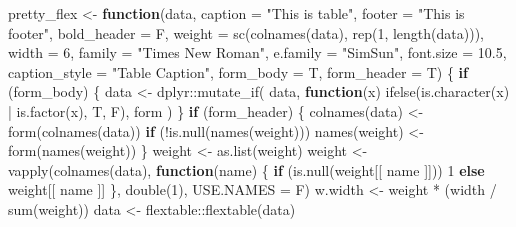 \documentclass[
]{article}
\newenvironment{Shaded}{\begin{snugshade}}{\end{snugshade}}
\newcommand{\AttributeTok}[1]{\textcolor[rgb]{0.77,0.63,0.00}{#1}}
\newcommand{\ControlFlowTok}[1]{\textcolor[rgb]{0.13,0.29,0.53}{\textbf{#1}}}
\newcommand{\DecValTok}[1]{\textcolor[rgb]{0.00,0.00,0.81}{#1}}
\newcommand{\FloatTok}[1]{\textcolor[rgb]{0.00,0.00,0.81}{#1}}
\newcommand{\FunctionTok}[1]{\textcolor[rgb]{0.00,0.00,0.00}{#1}}
\newcommand{\NormalTok}[1]{#1}
\newcommand{\OtherTok}[1]{\textcolor[rgb]{0.56,0.35,0.01}{#1}}
\newcommand{\SpecialCharTok}[1]{\textcolor[rgb]{0.00,0.00,0.00}{#1}}
\newcommand{\StringTok}[1]{\textcolor[rgb]{0.31,0.60,0.02}{#1}}
\begin{document}
\begin{Shaded}
\begin{Highlighting}[]
\NormalTok{pretty\_flex }\OtherTok{\textless{}{-}} \ControlFlowTok{function}\NormalTok{(data,}
  \AttributeTok{caption =} \StringTok{"This is table"}\NormalTok{, }\AttributeTok{footer =} \StringTok{"This is footer"}\NormalTok{,  }\AttributeTok{bold\_header =}\NormalTok{ F,}
  \AttributeTok{weight =} \FunctionTok{sc}\NormalTok{(}\FunctionTok{colnames}\NormalTok{(data), }\FunctionTok{rep}\NormalTok{(}\DecValTok{1}\NormalTok{, }\FunctionTok{length}\NormalTok{(data))), }\AttributeTok{width =} \DecValTok{6}\NormalTok{,}
  \AttributeTok{family =} \StringTok{"Times New Roman"}\NormalTok{, }\AttributeTok{e.family =} \StringTok{"SimSun"}\NormalTok{, }\AttributeTok{font.size =} \FloatTok{10.5}\NormalTok{,}
  \AttributeTok{caption\_style =} \StringTok{"Table Caption"}\NormalTok{, }\AttributeTok{form\_body =}\NormalTok{ T, }\AttributeTok{form\_header =}\NormalTok{ T)}
\NormalTok{\{}
  \ControlFlowTok{if}\NormalTok{ (form\_body) \{}
\NormalTok{    data }\OtherTok{\textless{}{-}}\NormalTok{ dplyr}\SpecialCharTok{::}\FunctionTok{mutate\_if}\NormalTok{(}
\NormalTok{      data, }\ControlFlowTok{function}\NormalTok{(x) }\FunctionTok{ifelse}\NormalTok{(}\FunctionTok{is.character}\NormalTok{(x) }\SpecialCharTok{|} \FunctionTok{is.factor}\NormalTok{(x), T, F), form}
\NormalTok{    )}
\NormalTok{  \}}
  \ControlFlowTok{if}\NormalTok{ (form\_header) \{}
    \FunctionTok{colnames}\NormalTok{(data) }\OtherTok{\textless{}{-}} \FunctionTok{form}\NormalTok{(}\FunctionTok{colnames}\NormalTok{(data))}
    \ControlFlowTok{if}\NormalTok{ (}\SpecialCharTok{!}\FunctionTok{is.null}\NormalTok{(}\FunctionTok{names}\NormalTok{(weight)))}
      \FunctionTok{names}\NormalTok{(weight) }\OtherTok{\textless{}{-}} \FunctionTok{form}\NormalTok{(}\FunctionTok{names}\NormalTok{(weight))}
\NormalTok{  \}}
\NormalTok{  weight }\OtherTok{\textless{}{-}} \FunctionTok{as.list}\NormalTok{(weight)}
\NormalTok{  weight }\OtherTok{\textless{}{-}} \FunctionTok{vapply}\NormalTok{(}\FunctionTok{colnames}\NormalTok{(data),}
    \ControlFlowTok{function}\NormalTok{(name) \{}
      \ControlFlowTok{if}\NormalTok{ (}\FunctionTok{is.null}\NormalTok{(weight[[ name ]])) }\DecValTok{1} \ControlFlowTok{else}\NormalTok{ weight[[ name ]]}
\NormalTok{    \}, }\FunctionTok{double}\NormalTok{(}\DecValTok{1}\NormalTok{), }\AttributeTok{USE.NAMES =}\NormalTok{ F)}
\NormalTok{  w.width }\OtherTok{\textless{}{-}}\NormalTok{ weight }\SpecialCharTok{*}\NormalTok{ (width }\SpecialCharTok{/} \FunctionTok{sum}\NormalTok{(weight))}
\NormalTok{  data }\OtherTok{\textless{}{-}}\NormalTok{ flextable}\SpecialCharTok{::}\FunctionTok{flextable}\NormalTok{(data)}

\end{Highlighting}
\end{Shaded}
\end{document}
